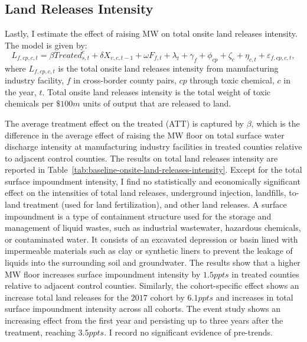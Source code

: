 \documentclass[12pt, english]{article}
\begin{document}
    \subsection{Land Releases Intensity}\label{subsec:land-releases-intensity}
    Lastly, I estimate the effect of raising MW on total onsite land releases intensity. The model is given by:
    \begin{equation}
        L_{f,cp,c,t} = \beta Treated_{s,t}^e + \delta X_{v,c,t-1} + \omega F_{f,t} + \lambda_{t} + \gamma_{f} + \phi_{cp} + \zeta_{c} + \eta_{c,t} + \varepsilon_{f,cp,c,t},\label{eq:baseline-onsite-land-releases-intensity}
    \end{equation}
    where $L_{f,cp,c,t}$ is the total onsite land releases intensity from manufacturing industry facility, $f$ in cross-border county pairs, $cp$ through toxic chemical, $c$ in the year, $t$. Total onsite land releases intensity is the total weight of toxic chemicals per $\$100m$ units of output that are released to land.
    

    The average treatment effect on the treated (ATT) is captured by $\beta$, which is the difference in the average effect of raising the MW floor on total surface water discharge intensity at manufacturing industry facilities in treated counties relative to adjacent control counties. The results on total land releases intensity are reported in Table~\ref{tab:baseline-onsite-land-releases-intensity}. Except for the total surface impoundment intensity, I find no statistically and economically significant effect on the intensities of total land releases, underground injection, landfills, to-land treatment (used for land fertilization), and other land releases. A surface impoundment is a type of containment structure used for the storage and management of liquid wastes, such as industrial wastewater, hazardous chemicals, or contaminated water. It consists of an excavated depression or basin lined with impermeable materials such as clay or synthetic liners to prevent the leakage of liquids into the surrounding soil and groundwater. The results show that a higher MW floor increases surface impoundment intensity by $1.5ppts$ in treated counties relative to adjacent control counties. Similarly, the cohort-specific effect shows an increase total land releases for the $2017$ cohort by $6.1ppts$ and increases in total surface impoundment intensity across all cohorts. The event study shows an increasing effect from the first year and persisting up to three years after the treatment, reaching $3.5ppts$. I record no significant evidence of pre-trends.
    
\end{document}
